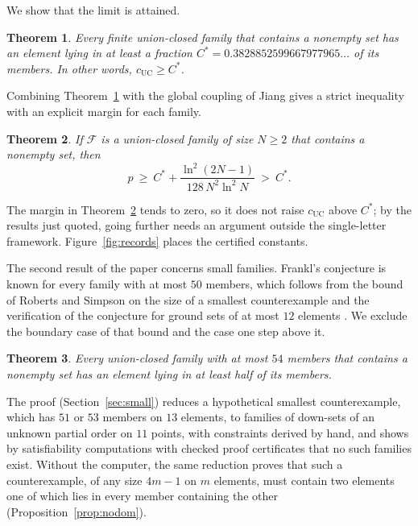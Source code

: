 \documentclass[12pt]{article}
\theoremstyle{plain}
\newtheorem{mainthm}{Theorem}
\newcommand{\cF}{\mathcal{F}}
\newcommand{\Cs}{C^{*}}
\begin{document}
We show that the limit is attained.

\begin{mainthm}\label{thm:main}
Every finite union-closed family that contains a nonempty set has an element lying in at least a fraction $\Cs=0.3828852599667977965\ldots$ of its members. In other words, $c_{\mathrm{UC}}\ge\Cs$.
\end{mainthm}

Combining Theorem~\ref{thm:main} with the global coupling of Jiang \cite[Theorem~10.2]{Jia26} gives a strict inequality with an explicit margin for each family.

\begin{mainthm}\label{thm:strict}
If $\cF$ is a union-closed family of size $N\ge 2$ that contains a nonempty set, then
\[
p\ \ge\ \Cs+\frac{\ln^2(2N-1)}{128\,N^2\ln^2 N}\ >\ \Cs .
\]
\end{mainthm}

The margin in Theorem~\ref{thm:strict} tends to zero, so it does not raise $c_{\mathrm{UC}}$ above $\Cs$; by the results just quoted, going further needs an argument outside the single-letter framework. Figure~\ref{fig:records} places the certified constants.

The second result of the paper concerns small families. Frankl's conjecture is known for every family with at most $50$ members, which follows from the bound of Roberts and Simpson \cite{RS10} on the size of a smallest counterexample and the verification of the conjecture for ground sets of at most $12$ elements \cite{VZ17,BS15}. We exclude the boundary case of that bound and the case one step above it.

\begin{mainthm}\label{thm:small}
Every union-closed family with at most $54$ members that contains a nonempty set has an element lying in at least half of its members.
\end{mainthm}

The proof (Section~\ref{sec:small}) reduces a hypothetical smallest counterexample, which has $51$ or $53$ members on $13$ elements, to families of down-sets of an unknown partial order on $11$ points, with constraints derived by hand, and shows by satisfiability computations with checked proof certificates that no such families exist. Without the computer, the same reduction proves that such a counterexample, of any size $4m-1$ on $m$ elements, must contain two elements one of which lies in every member containing the other (Proposition~\ref{prop:nodom}).
\end{document}
